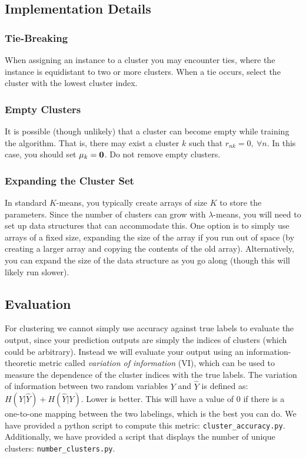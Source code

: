 \documentclass[11pt]{article}
\newcommand{\vmuk}{{\bf \mu}_k}
\newcommand{\code}[1]{{\footnotesize \tt #1}}
\begin{document}
\subsection{Implementation Details}

\subsubsection{Tie-Breaking}
When assigning an instance to a cluster you may encounter ties, where the instance is equidistant to two or more clusters. When a tie occurs, select the cluster with the lowest cluster index.

\subsubsection{Empty Clusters}
It is possible (though unlikely) that a cluster can become empty while training the algorithm. That is, there may exist a cluster $k$ such that $r_{nk}=0,\ \forall n$. In this case, you should set $\vmuk={\mathbf 0}$. Do not remove empty clusters.

\subsubsection{Expanding the Cluster Set}
In standard $K$-means, you typically create arrays of size $K$ to store the parameters. Since the number of clusters can grow with $\lambda$-means, you will need to set up data structures that can accommodate this.
One option is to simply use arrays of a fixed size, expanding the size of the array if you run out of space (by creating a larger array and copying the contents of the old array). Alternatively, you can expand the size of the data structure as you go along (though this will likely run slower).


\subsection{Evaluation}
\label{sec:evaluation}

For clustering we cannot simply use accuracy against true labels to evaluate the output, since your prediction outputs are simply the indices of clusters (which could be arbitrary).  Instead we will evaluate your output using an information-theoretic metric called {\em variation of information} (VI), which can be used to measure the dependence of the cluster indices with the true labels.
The variation of information between two random variables $Y$ and $\hat{Y}$ is defined as: $H(Y|\hat{Y}) + H(\hat{Y}|Y)$. Lower is better. This will have a value of 0 if there is a one-to-one mapping between the two labelings, which is the best you can do.
We have provided a python script to compute this metric: \code{cluster\_accuracy.py}.  Additionally, we have provided a script that displays the number of unique clusters: \code{number\_clusters.py}.
\end{document}
